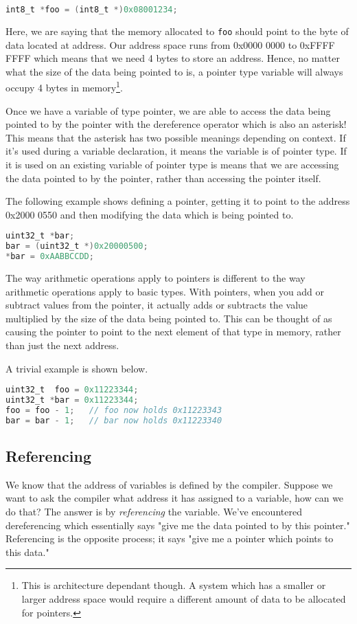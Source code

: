 \begin{lstlisting}[language=C]
int8_t *foo = (int8_t *)0x08001234;
\end{lstlisting}

Here, we are saying that the memory allocated to \texttt{foo} should point to the byte of data located at address.
Our address space runs from 0x0000 0000 to 0xFFFF FFFF which means that we need 4 bytes to store an address. Hence, no matter what the size of the data being pointed to is, a pointer type variable will always occupy 4 bytes in memory\footnote{This is architecture dependant though. A system which has a smaller or larger address space would require a different amount of data to be allocated for pointers.}.

Once we have a variable of type pointer, we are able to access the data being pointed to by the pointer with the dereference operator which is also an asterisk! This means that the asterisk has two possible meanings depending on context. If it's used during a variable declaration, it means the variable is of pointer type. If it is used on an existing variable of pointer type is means that we are accessing the data pointed to by the pointer, rather than accessing the pointer itself.

The following example shows defining a pointer, getting it to point to the address 0x2000 0550 and then modifying the data which is being pointed to.
\begin{lstlisting}[language=C]
uint32_t *bar;
bar = (uint32_t *)0x20000500;
*bar = 0xAABBCCDD;
\end{lstlisting}

The way arithmetic operations apply to pointers is different to the way arithmetic operations apply to basic types. With pointers, when you add or subtract values from the pointer, it actually adds or subtracts the value multiplied by the size of the data being pointed to. This can be thought of as causing the pointer to point to the next element of that type in memory, rather than just the next address.

A trivial example is shown below.
\begin{lstlisting}[language=C]
uint32_t  foo = 0x11223344;
uint32_t *bar = 0x11223344;
foo = foo - 1;   // foo now holds 0x11223343
bar = bar - 1;   // bar now holds 0x11223340
\end{lstlisting}

\subsection{Referencing}
We know that the address of variables is defined by the compiler. Suppose we want to ask the compiler what address it has assigned to a variable, how can we do that? The answer is by \emph{referencing} the variable. We've encountered dereferencing which essentially says "give me the data pointed to by this pointer." Referencing is the opposite process; it says "give me a pointer which points to this data." 

